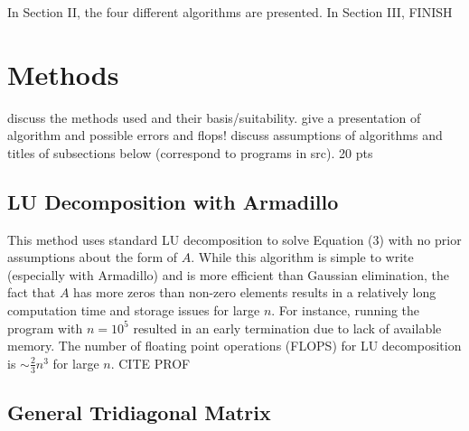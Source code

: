 \documentclass[prb,aps,twocolumn,showpacs,10pt]{revtex4-1}
\begin{document}
In Section II, the four different algorithms are presented. In Section III, FINISH


\section{Methods}

discuss the methods used and their basis/suitability. give a presentation of algorithm and possible errors and flops! discuss assumptions of algorithms and titles of subsections below (correspond to programs in src). 20 pts

\subsection{LU Decomposition with Armadillo}

This method uses standard LU decomposition to solve Equation (3) with no prior assumptions about the form of $A$. While this algorithm is simple to write (especially with Armadillo) and is more efficient than Gaussian elimination, the fact that $A$ has more zeros than non-zero elements results in a relatively long computation time and storage issues for large $n$. For instance, running the program with $n=10^5$ resulted in an early termination due to lack of available memory. The number of floating point operations (FLOPS) for LU decomposition is $\sim \frac{2}{3}n^3$ for large $n$. CITE PROF

\subsection{General Tridiagonal Matrix}
\end{document}
